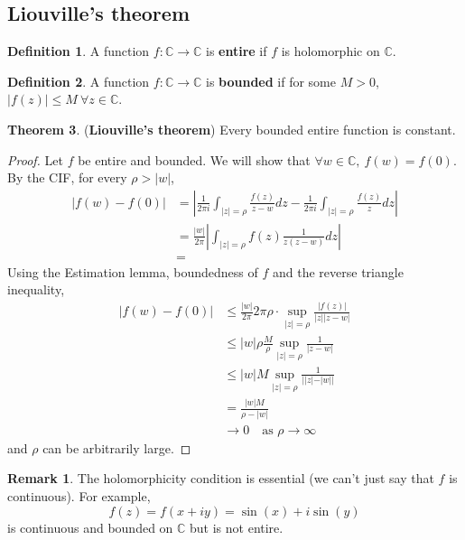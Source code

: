 \documentclass[12pt,a4paper]{article}
\theoremstyle{definition}
\newtheorem{definition}{Definition}[subsection]
\newtheorem{theorem}[definition]{Theorem}
\newtheorem*{remark}{Remark}
\begin{document}
\subsection{Liouville's theorem}

\begin{definition}
	A function $f: \mathbb{C} \rightarrow \mathbb{C}$ is \textbf{entire} if $f$ is holomorphic on $\mathbb{C}$.
\end{definition}

\begin{definition}
	A function $f: \mathbb{C} \rightarrow \mathbb{C}$ is \textbf{bounded} if for some $M > 0$, $|f(z)| \le M \ \forall z \in \mathbb{C}$.
\end{definition}

\begin{theorem}
	(\textbf{Liouville's theorem}) Every bounded entire function is constant.
\end{theorem}

\begin{proof}
	Let $f$ be entire and bounded. We will show that $\forall w \in \mathbb{C}, \ f(w) = f(0)$. By the CIF, for every $\rho > |w|$,
	\[
		\begin{aligned}
			|f(w) - f(0)|
				& = \left| \frac{1}{2 \pi i} \int_{|z| = \rho} \frac{f(z)}{z - w} dz - \frac{1}{2 \pi i} \int_{|z| = \rho} \frac{f(z)}{z} dz \right| \\
				& = \frac{|w|}{2 \pi} \left| \int_{|z| = \rho} f(z) \frac{1}{z(z - w)} dz \right| \\
				& = 
		\end{aligned}
	\]
	Using the Estimation lemma, boundedness of $f$ and the reverse triangle inequality,
	\[
		\begin{aligned}
			|f(w) - f(0)|
				& \le \frac{|w|}{2 \pi} 2 \pi \rho \cdot \sup_{|z| = \rho} \frac{|f(z)|}{|z| |z - w|} \\
				& \le |w| \rho \frac{M}{\rho} \sup_{|z| = \rho} \frac{1}{|z - w|} \\
				& \le |w| M \sup_{|z| = \rho} \frac{1}{| |z| - |w| |} \\
				& = \frac{|w| M}{\rho - |w|} \\
				& \rightarrow 0 \quad \text{as } \rho \rightarrow \infty
		\end{aligned}
	\]
	and $\rho$ can be arbitrarily large.
\end{proof}

\begin{remark}
	The holomorphicity condition is essential (we can't just say that $f$ is continuous). For example,
	\[
		f(z) = f(x + iy) = \sin(x) + i \sin(y)
	\]
	is continuous and bounded on $\mathbb{C}$ but is not entire.
\end{remark}
\end{document}
